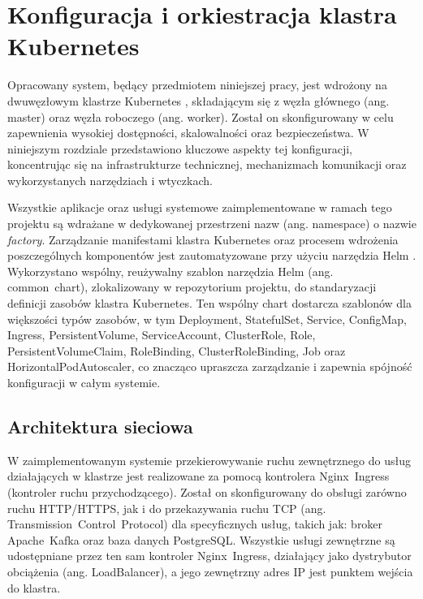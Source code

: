 \section{Konfiguracja i orkiestracja klastra Kubernetes}
\label{chap:konfiguracja_kubernetes}

Opracowany system, będący przedmiotem niniejszej pracy, jest wdrożony na dwuwęzłowym klastrze Kubernetes \cite{kubernetes}, składającym się z węzła głównego (ang. \mbox{master}) oraz węzła roboczego (ang. \mbox{worker}). Został on skonfigurowany w celu zapewnienia wysokiej dostępności, skalowalności oraz bezpieczeństwa. W niniejszym rozdziale przedstawiono kluczowe aspekty tej konfiguracji, koncentrując się na infrastrukturze technicznej, mechanizmach komunikacji oraz wykorzystanych narzędziach i wtyczkach.

Wszystkie aplikacje oraz usługi systemowe zaimplementowane w ramach tego projektu są wdrażane w dedykowanej przestrzeni nazw (ang. \mbox{namespace}) o nazwie \textit{factory}. Zarządzanie manifestami klastra Kubernetes oraz procesem wdrożenia poszczególnych komponentów jest zautomatyzowane przy użyciu narzędzia Helm \cite{helm_docs}. Wykorzystano wspólny, reużywalny szablon narzędzia Helm (ang. \mbox{common chart}), zlokalizowany w repozytorium projektu, do standaryzacji definicji zasobów klastra Kubernetes. Ten wspólny chart dostarcza szablonów dla większości typów zasobów, w tym \mbox{Deployment}, \mbox{StatefulSet}, \mbox{Service}, \mbox{ConfigMap}, \mbox{Ingress}, \mbox{PersistentVolume},  \mbox{ServiceAccount}, \mbox{ClusterRole},  \mbox{Role}, \mbox{PersistentVolumeClaim},   \mbox{RoleBinding},   \mbox{ClusterRoleBinding}, \mbox{Job} oraz \mbox{HorizontalPodAutoscaler}, co znacząco upraszcza zarządzanie i zapewnia spójność konfiguracji w całym systemie.

\subsection{Architektura sieciowa}

W zaimplementowanym systemie przekierowywanie ruchu zewnętrznego do usług działających w klastrze jest realizowane za pomocą kontrolera \mbox{Nginx Ingress} \cite{nginx_ingress_docs} (kontroler ruchu przychodzącego). Został on skonfigurowany do obsługi zarówno ruchu \mbox{HTTP/HTTPS}, jak i do przekazywania ruchu TCP (ang. \mbox{Transmission Control Protocol}) \cite{tanenbaum2011computer} dla specyficznych usług, takich jak: broker \mbox{Apache Kafka} oraz baza danych \mbox{PostgreSQL}. Wszystkie usługi zewnętrzne są udostępniane przez ten sam kontroler \mbox{Nginx Ingress}, działający jako dystrybutor obciążenia (ang. \mbox{LoadBalancer}), a jego zewnętrzny adres IP jest punktem wejścia do klastra.


